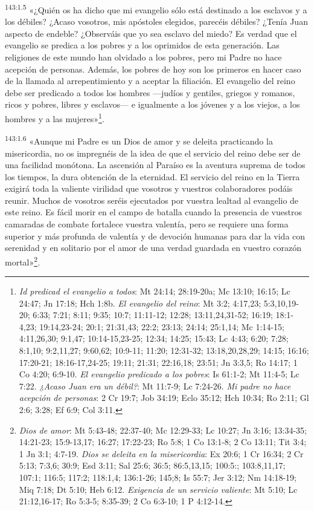 \par 
\textsuperscript{143:1.5} «¿Quién os ha dicho que mi evangelio sólo está destinado a los esclavos y a los débiles? ¿Acaso vosotros, mis apóstoles elegidos, parecéis débiles? ¿Tenía Juan aspecto de endeble? ¿Observáis que yo sea esclavo del miedo? Es verdad que el evangelio se predica a los pobres y a los oprimidos de esta generación. Las religiones de este mundo han olvidado a los pobres, pero mi Padre no hace acepción de personas. Además, los pobres de hoy son los primeros en hacer caso de la llamada al arrepentimiento y a aceptar la filiación. El evangelio del reino debe ser predicado a todos los hombres ---judíos y gentiles, griegos y romanos, ricos y pobres, libres y esclavos--- e igualmente a los jóvenes y a los viejos, a los hombres y a las mujeres»\footnote{\textit{Id predicad el evangelio a todos}: Mt 24:14; 28:19-20a; Mc 13:10; 16:15; Lc 24:47; Jn 17:18; Hch 1:8b. \textit{El evangelio del reino}: Mt 3:2; 4:17,23; 5:3,10,19-20; 6:33; 7:21; 8:11; 9:35; 10:7; 11:11-12; 12:28; 13:11,24,31-52; 16:19; 18:1-4,23; 19:14,23-24; 20:1; 21:31,43; 22:2; 23:13; 24:14; 25:1,14; Mc 1:14-15; 4:11,26,30; 9:1,47; 10:14-15,23-25; 12:34; 14:25; 15:43; Lc 4:43; 6:20; 7:28; 8:1,10; 9:2,11,27; 9:60,62; 10:9-11; 11:20; 12:31-32; 13:18,20,28,29; 14:15; 16:16; 17:20-21; 18:16-17,24-25; 19:11; 21:31; 22:16,18; 23:51; Jn 3:3,5; Ro 14:17; 1 Co 4:20; 6:9-10. \textit{El evangelio predicado a los pobres}: Is 61:1-2; Mt 11:4-5; Lc 7:22. \textit{¿Acaso Juan era un débil?}: Mt 11:7-9; Lc 7:24-26. \textit{Mi padre no hace acepción de personas}: 2 Cr 19:7; Job 34:19; Eclo 35:12; Hch 10:34; Ro 2:11; Gl 2:6; 3:28; Ef 6:9; Col 3:11.}.

\par 
\textsuperscript{143:1.6} «Aunque mi Padre es un Dios de amor y se deleita practicando la misericordia, no os impregnéis de la idea de que el servicio del reino debe ser de una facilidad monótona. La ascensión al Paraíso es la aventura suprema de todos los tiempos, la dura obtención de la eternidad. El servicio del reino en la Tierra exigirá toda la valiente virilidad que vosotros y vuestros colaboradores podáis reunir. Muchos de vosotros seréis ejecutados por vuestra lealtad al evangelio de este reino. Es fácil morir en el campo de batalla cuando la presencia de vuestros camaradas de combate fortalece vuestra valentía, pero se requiere una forma superior y más profunda de valentía y de devoción humanas para dar la vida con serenidad y en solitario por el amor de una verdad guardada en vuestro corazón mortal»\footnote{\textit{Dios de amor}: Mt 5:43-48; 22:37-40; Mc 12:29-33; Lc 10:27; Jn 3:16; 13:34-35; 14:21-23; 15:9-13,17; 16:27; 17:22-23; Ro 5:8; 1 Co 13:1-8; 2 Co 13:11; Tit 3:4; 1 Jn 3:1; 4:7-19. \textit{Dios se deleita en la misericordia}: Ex 20:6; 1 Cr 16:34; 2 Cr 5:13; 7:3,6; 30:9; Esd 3:11; Sal 25:6; 36:5; 86:5,13,15; 100:5:; 103:8,11,17; 107:1; 116:5; 117:2; 118:1,4; 136:1-26; 145;8; Is 55:7; Jer 3:12; Nm 14:18-19; Miq 7:18; Dt 5:10; Heb 6:12. \textit{Exigencia de un servicio valiente}: Mt 5:10; Lc 21:12,16-17; Ro 5:3-5; 8:35-39; 2 Co 6:3-10; 1 P 4:12-14.}.

